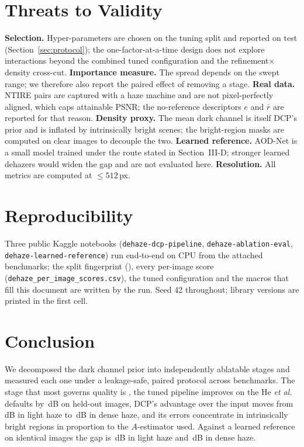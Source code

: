 \documentclass[conference]{IEEEtran}
\begin{document}
\section{Threats to Validity}
\textbf{Selection.} Hyper-parameters are chosen on the tuning split and reported on test (Section~\ref{sec:protocol}); the one-factor-at-a-time
design does not explore interactions beyond the combined tuned configuration and the refinement$\times$density cross-cut.
\textbf{Importance measure.} The spread depends on the swept range; we therefore also report the paired effect of
removing a stage. \textbf{Real data.} NTIRE pairs are captured with a haze machine and are not pixel-perfectly aligned,
which caps attainable PSNR; the no-reference descriptors $e$ and $\bar r$ are reported for that reason. \textbf{Density
proxy.} The mean dark channel is itself DCP's prior and is inflated by intrinsically bright scenes; the bright-region
masks are computed on clear images to decouple the two. \textbf{Learned reference.} AOD-Net is a small model trained under
the route stated in Section~III-D; stronger learned dehazers would widen the gap and are not evaluated here.
\textbf{Resolution.} All metrics are computed at $\le512$\,px.

\section{Reproducibility}
Three public Kaggle notebooks (\texttt{dehaze-dcp-pipeline}, \texttt{dehaze-ablation-eval},
\texttt{dehaze-learned-reference}) run end-to-end on CPU from the attached benchmarks; the split fingerprint
(\texttt{\splitFingerprint}), every per-image score (\texttt{dehaze\_per\_image\_scores.csv}), the tuned configuration and
the macros that fill this document are written by the run. Seed 42 throughout; library versions are printed in the first
cell.

\section{Conclusion}
We decomposed the dark channel prior into independently ablatable stages and measured each one under a leakage-safe,
paired protocol across \nDatasets{} benchmarks. The stage that most governs quality is \impTop{}, the tuned pipeline
improves on the He \emph{et al.} defaults by \tunedDelta{}\,dB on held-out images, DCP's advantage over the input moves from
\gainLight{}\,dB in light haze to \gainDense{}\,dB in dense haze, and its errors concentrate in intrinsically bright regions
in proportion to the $A$-estimator used. Against a learned reference on identical images the gap is \gapLight{}\,dB in
light haze and \gapDense{}\,dB in dense haze.
\end{document}
